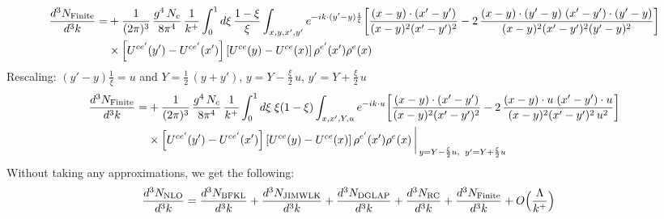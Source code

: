 \documentclass[9pt]{article}
\numberwithin{equation}{section}
\begin{document}
\begin{align}
\frac{d^{3}N_{\rm Finite}}{d^{3}k}= &  +\frac{1}{(2\pi)^{3}}\,\frac{g^{4}\,N_{c}}{8\pi^{4}}\,\frac{1}{k^{+}}\int_{0}^{1}d\xi\,\frac{1-\xi}{\xi}\int_{x,y,x',y'}e^{-ik\cdot(y'-y)\frac{1}{\xi}}\bigg[\frac{(x-y)\cdot(x'-y')}{(x-y)^{2}(x'-y')^{2}}-2\,\frac{(x-y)\cdot(y'-y)\;(x'-y')\cdot(y'-y)}{(x-y)^{2}(x'-y')^{2}(y'-y)^{2}}\bigg]\notag\\
&\times\left[U^{ce'}(y') - U^{ce'}(x')\right]\left[U^{ce}(y) - U^{ce}(x)\right]\rho^{e'}(x')\rho^{e}(x)
\end{align}
Rescaling: $ (y'-y)\frac{1}{\xi} = u$ and $Y = \frac{1}{2}\, (y+y')$, $y = Y - \frac{\xi}{2}\,u$, $y' = Y +\frac{\xi}{2}\,u$
\begin{align}
\frac{d^{3}N_{\rm Finite}}{d^{3}k}= &  +\frac{1}{(2\pi)^{3}}\,\frac{g^{4}\,N_{c}}{8\pi^{4}}\,\frac{1}{k^{+}}\int_{0}^{1}d\xi\;\xi(1-\xi)\int_{x,x',Y,u}e^{-ik\cdot u}\bigg[\frac{(x-y)\cdot(x'-y')}{(x-y)^{2}(x'-y')^{2}}-2\,\frac{(x-y)\cdot u\;(x'-y')\cdot u}{(x-y)^{2}(x'-y')^{2}\,u^{2}}\bigg]\notag\\
&\times\left[U^{ce'}(y') - U^{ce'}(x')\right]\left[U^{ce}(y) - U^{ce}(x)\right]\rho^{e'}(x')\rho^{e}(x)\,\bigg|_{\,y=Y-\frac{\xi}{2}u,\;\;y'=Y+\frac{\xi}{2}u}
\end{align}
Without taking any approximations, we get the following: 
\begin{align}
    \frac{d^{3}N_{\rm NLO}}{d^{3}k} & = \frac{d^{3}N_{\rm BFKL}}{d^{3}k}+ \frac{d^{3}N_{\rm JIMWLK}}{d^{3}k}+\frac{d^{3}N_{\rm DGLAP}}{d^{3}k} + \frac{d^{3}N_{\rm RC}}{d^{3}k} + \frac{d^{3}N_{\rm Finite}}{d^{3}k}+O\Big(\frac{\Lambda}{k^{+}}\Big)
\end{align}
\end{document}
